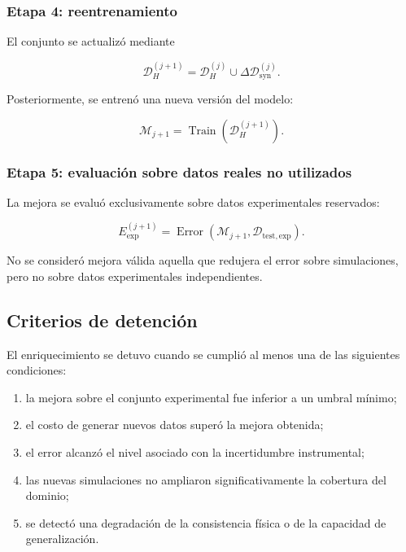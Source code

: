 \subsubsection*{Etapa 4: reentrenamiento}

El conjunto se actualizó mediante

\begin{equation}
\mathcal{D}_{H}^{(j+1)}
=
\mathcal{D}_{H}^{(j)}
\cup
\Delta\mathcal{D}_{\mathrm{syn}}^{(j)}.
\end{equation}

Posteriormente, se entrenó una nueva versión del modelo:

\begin{equation}
\mathcal{M}_{j+1}
=
\operatorname{Train}
\left(
\mathcal{D}_{H}^{(j+1)}
\right).
\end{equation}

\subsubsection*{Etapa 5: evaluación sobre datos reales no utilizados}

La mejora se evaluó exclusivamente sobre datos experimentales reservados:

\begin{equation}
E_{\mathrm{exp}}^{(j+1)}
=
\operatorname{Error}
\left(
\mathcal{M}_{j+1},
\mathcal{D}_{\mathrm{test,exp}}
\right).
\end{equation}

No se consideró mejora válida aquella que redujera el error sobre simulaciones, pero no sobre datos experimentales independientes.

\subsection{Criterios de detención}
\label{subsec:criterios_detencion_bucle}

El enriquecimiento se detuvo cuando se cumplió al menos una de las siguientes condiciones:

\begin{enumerate}
    \item la mejora sobre el conjunto experimental fue inferior a un umbral mínimo;
    \item el costo de generar nuevos datos superó la mejora obtenida;
    \item el error alcanzó el nivel asociado con la incertidumbre instrumental;
    \item las nuevas simulaciones no ampliaron significativamente la cobertura del dominio;
    \item se detectó una degradación de la consistencia física o de la capacidad de generalización.
\end{enumerate}

